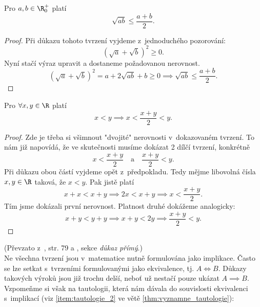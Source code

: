 \begin{proposition}[AG nerovnost]
    Pro $a,b\in\R_0^+$ platí
    \begin{equation*}
        \sqrt{ab}\leq\dfrac{a+b}{2}.
    \end{equation*}
\end{proposition}
\begin{proof}
    Při důkazu tohoto tvrzení vyjdeme z~jednoduchého pozorování:
    \begin{equation*}
        (\sqrt{a}+\sqrt{b})^2\geq 0.
    \end{equation*}
    Nyní stačí výraz upravit a dostaneme požadovanou nerovnost.
    \begin{equation*}
        (\sqrt{a}+\sqrt{b})^2 = a+2\sqrt{ab}+b\geq 0 \implies \sqrt{ab}\leq \dfrac{a+b}{2}.
    \end{equation*}
\end{proof}
\begin{proposition}
    Pro $\forall x,y\in\R$ platí
    \begin{equation*}
        x<y \implies x<\dfrac{x+y}{2}<y.
    \end{equation*}
\end{proposition}
\begin{proof}
    Zde je třeba si všimnout "dvojité" nerovnosti v~dokazovaném tvrzení. To nám již napovídá, že ve skutečnosti musíme dokázat 2 dílčí tvrzení, konkrétně
    \begin{equation*}
        x < \dfrac{x+y}{2}\quad\text{a}\quad\dfrac{x+y}{2} < y.
    \end{equation*}
    Při důkazu obou částí vyjdeme opět z~předpokladu. Tedy mějme libovolná čísla $x,y\in\R$ taková, že $x<y$. Pak jistě platí
    \begin{equation*}
        x+x<x+y \implies 2x<x+y \implies x<\dfrac{x+y}{2}.
    \end{equation*}
    Tím jsme dokázali první nerovnost. Platnost druhé dokážeme analogicky:
    \begin{equation*}
        x+y<y+y \implies x+y<2y \implies \dfrac{x+y}{2}<y.
    \end{equation*}
\end{proof}
(Převzato z~\cite{ChartrandPolimeniZhang2014}, str. 79 a \cite{MatematickaLogikaUK2010}, sekce \emph{důkaz přímý}.)\\
Ne všechna tvrzení jsou v~matematice nutně formulována jako implikace. Často se lze setkat s~tvrzeními formulovanými jako ekvivalence, tj. $A \iff B$. Důkazy takových výroků jsou již trochu delší, neboť už nestačí pouze ukázat $A \implies B$. Vzpomeňme si však na tautologii, která nám dávala do souvislosti ekvivalenci s~implikací (viz \ref{item:tautologie_2} ve větě \ref{thm:vyznamne_tautologie}):

